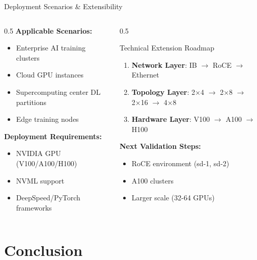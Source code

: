 \documentclass[aspectratio=169,10pt]{beamer}
\begin{document}
\begin{frame}{Deployment Scenarios \& Extensibility}
\begin{columns}
\begin{column}{0.5\textwidth}
\textbf{Applicable Scenarios:}
\begin{itemize}
    \item Enterprise AI training clusters
    \item Cloud GPU instances
    \item Supercomputing center DL partitions
    \item Edge training nodes
\end{itemize}
\vspace{0.3cm}
\textbf{Deployment Requirements:}
\begin{itemize}
    \item NVIDIA GPU (V100/A100/H100)
    \item NVML support
    \item DeepSpeed/PyTorch frameworks
\end{itemize}
\end{column}
\begin{column}{0.5\textwidth}
\begin{block}{Technical Extension Roadmap}
\begin{enumerate}
    \item \textbf{Network Layer}: IB $\rightarrow$ RoCE $\rightarrow$ Ethernet
    \item \textbf{Topology Layer}: 2×4 $\rightarrow$ 2×8 $\rightarrow$ 2×16 $\rightarrow$ 4×8
    \item \textbf{Hardware Layer}: V100 $\rightarrow$ A100 $\rightarrow$ H100
\end{enumerate}
\end{block}
\vspace{0.3cm}
\textbf{Next Validation Steps:}
\begin{itemize}
    \item RoCE environment (sd-1, sd-2)
    \item A100 clusters
    \item Larger scale (32-64 GPUs)
\end{itemize}
\end{column}
\end{columns}
\end{frame}

\section{Conclusion}
\end{document}
